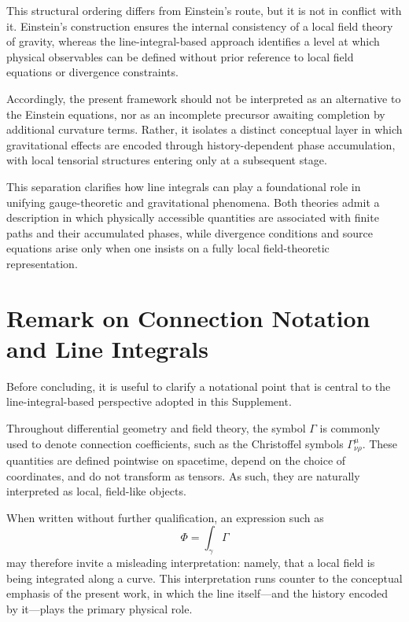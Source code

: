 \documentclass[12pt,letterpaper]{article} %
\begin{document}
This structural ordering differs from Einstein's route, but it is not in conflict with it. Einstein's construction ensures the internal consistency of a local field theory of gravity, whereas the line-integral-based approach identifies a level at which physical observables can be defined without prior reference to local field equations or divergence constraints.

Accordingly, the present framework should not be interpreted as an alternative to the Einstein equations, nor as an incomplete precursor awaiting completion by additional curvature terms. Rather, it isolates a distinct conceptual layer in which gravitational effects are encoded through history-dependent phase accumulation, with local tensorial structures entering only at a subsequent stage.

This separation clarifies how line integrals can play a foundational role in unifying gauge-theoretic and gravitational phenomena. Both theories admit a description in which physically accessible quantities are associated with finite paths and their accumulated phases, while divergence conditions and source equations arise only when one insists on a fully local field-theoretic representation.


\section{Remark on Connection Notation and Line Integrals}

\justifying
Before concluding, it is useful to clarify a notational point that is central to the line-integral-based perspective adopted in this Supplement.

Throughout differential geometry and field theory, the symbol $\Gamma$ is commonly used to denote connection coefficients, such as the Christoffel symbols $\Gamma^\mu_{\nu\rho}$. These quantities are defined pointwise on spacetime, depend on the choice of coordinates, and do not transform as tensors.  
As such, they are naturally interpreted as local, field-like objects.

When written without further qualification, an expression such as
\begin{equation}
\Phi = \int_\gamma \Gamma
\end{equation}
may therefore invite a misleading interpretation: namely, that a local field is being integrated along a curve.  
This interpretation runs counter to the conceptual emphasis of the present work, in which the line itself—and the history encoded by it—plays the primary physical role.
\end{document}
